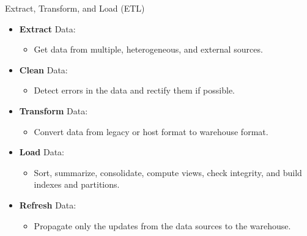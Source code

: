 \begin{frame}{Extract, Transform, and Load (ETL)}
	\begin{itemize}
		\item \textbf{\color{airforceblue}Extract} Data:
		      \begin{itemize}
			      \item Get data from multiple, heterogeneous, and external sources.
		      \end{itemize}
		\item \textbf{Clean} Data:
		      \begin{itemize}
			      \item Detect errors in the data and rectify them if possible.
		      \end{itemize}
		\item \textbf{\color{airforceblue}Transform} Data:
		      \begin{itemize}
			      \item Convert data from legacy or host format to warehouse format.
		      \end{itemize}
		\item \textbf{\color{airforceblue}Load} Data:
		      \begin{itemize}
			      \item Sort, summarize, consolidate, compute views, check integrity, and build indexes and partitions.
		      \end{itemize}
		\item \textbf{Refresh} Data:
		      \begin{itemize}
			      \item Propagate only the updates from the data sources to the warehouse.
		      \end{itemize}
	\end{itemize}
\end{frame}

